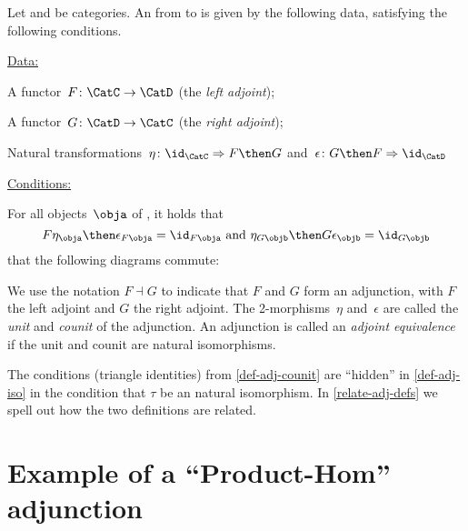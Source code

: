 \begin{ctdefinition}\label{def-adj-counit}
  \label{def:cat-adjunction}
 Let \CatC and \CatD be categories. An \emph{} from \CatC to \CatD is given by the following data, satisfying the following conditions.

  \underline{Data:}
  \begin{compactenum}
    \item A functor~$F\colon \CatC \to \CatD$ (the \emph{left adjoint});
    \item A functor~$G\colon \CatD \to \CatC$ (the \emph{right adjoint});
    \item Natural transformations~$\eta \colon \id_\CatC \Rightarrow F \then G$ and~$\epsilon \colon G \then F \Rightarrow \id_\CatD$
  \end{compactenum}

  \underline{Conditions:}
  \begin{compactenum}
    \item For all objects~$\obja$ of \CatC, it holds that
    \begin{equation*}
      F\eta_\obja \then \epsilon_{F\obja} = \id_{F\obja} \text{ and }  \eta_{G\objb} \then G\epsilon_\objb = \id_{G\objb}
    \end{equation*}
     that the following diagrams commute:

\begin{center}
\end{center}
  \end{compactenum}
  We use the notation $F \dashv G$ to indicate that $F$ and $G$ form an adjunction, with $F$ the left adjoint and $G$ the right adjoint. 
  The 2-morphisms~$\eta$ and~$\epsilon$ are called the \emph{unit} and \emph{counit} of the adjunction.
  An adjunction is called an \emph{adjoint equivalence} if the unit and counit are natural isomorphisms.
\end{ctdefinition}

\begin{remark}
The conditions (triangle identities) from \cref{def-adj-counit} are ``hidden'' in \cref{def-adj-iso} in the condition that $\tau$ be an natural isomorphism. In \cref{relate-adj-defs} we spell out how the two definitions are related. 
\end{remark}

\section{Example of a ``Product-Hom'' adjunction}

